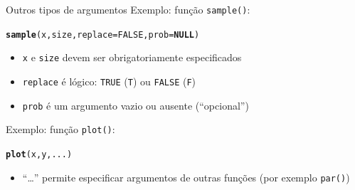 \documentclass[10pt,handout]{beamer}\usepackage[]{graphicx}\usepackage[]{color}
\makeatletter
\newcommand{\hlnum}[1]{\textcolor[rgb]{0.686,0.059,0.569}{#1}}%
\newcommand{\hlstd}[1]{\textcolor[rgb]{0.345,0.345,0.345}{#1}}%
\newcommand{\hlkwa}[1]{\textcolor[rgb]{0.161,0.373,0.58}{\textbf{#1}}}%
\newcommand{\hlkwc}[1]{\textcolor[rgb]{0.333,0.667,0.333}{#1}}%
\newcommand{\hlkwd}[1]{\textcolor[rgb]{0.282,0.239,0.545}{\textbf{#1}}}%
\newenvironment{kframe}{%
 \def\at@end@of@kframe{}%
 \ifinner\ifhmode%
  \def\at@end@of@kframe{\end{minipage}}%
  \begin{minipage}{\columnwidth}%
 \fi\fi%
 \def\FrameCommand##1{\hskip\@totalleftmargin \hskip-\fboxsep
 \colorbox{shadecolor}{##1}\hskip-\fboxsep
     \hskip-\linewidth \hskip-\@totalleftmargin \hskip\columnwidth}%
 \MakeFramed {\advance\hsize-\width
   \@totalleftmargin\z@ \linewidth\hsize
   \@setminipage}}%
 {\par\unskip\endMakeFramed%
 \at@end@of@kframe}
\newenvironment{knitrout}{}{} %
\makeatother
\begin{document}
\begin{frame}[fragile]{Outros tipos de argumentos}
Exemplo: função \verb|sample()|:
\begin{knitrout}\small
{}\color{fgcolor}\begin{kframe}
\begin{alltt}
\hlkwd{sample}\hlstd{(x, size,} \hlkwc{replace} \hlstd{=} \hlnum{FALSE}\hlstd{,} \hlkwc{prob} \hlstd{=} \hlkwa{NULL}\hlstd{)}
\end{alltt}
\end{kframe}
\end{knitrout}

\begin{itemize}
\item \verb|x| e \verb|size| devem ser obrigatoriamente especificados
\item \verb|replace| é lógico: \verb|TRUE| (\verb|T|) ou \verb|FALSE|
  (\verb|F|)
\item \verb|prob| é um argumento vazio ou ausente (``opcional'')
\end{itemize}
Exemplo: função \verb|plot()|:
\begin{knitrout}\small
{}\color{fgcolor}\begin{kframe}
\begin{alltt}
\hlkwd{plot}\hlstd{(x, y, ...)}
\end{alltt}
\end{kframe}
\end{knitrout}

\begin{itemize}
\item ``\ldots'' permite especificar argumentos de outras funções (por
  exemplo \verb|par()|)
\end{itemize}
\end{frame}
\end{document}
